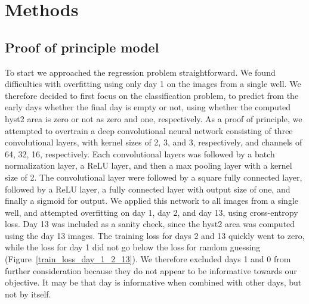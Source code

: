 \documentclass[10pt,twocolumn,letterpaper]{article}
\begin{document}



 \section{Methods}
 
 \subsection{Proof of principle model}
 \label{proof_of_principle}
 
 To start we approached the regression problem straightforward.  We found difficulties with overfitting using only day 1 on the images from a single well.  We therefore decided to first focus on the classification problem, to predict from the early days whether the final day is empty or not, using whether the computed hyst2 area is zero or not as zero and one, respectively.   As a proof of principle, we attempted to overtrain a deep convolutional neural network consisting of three convolutional layers, with kernel sizes of 2, 3, and 3, respectively, and channels of 64, 32, 16, respectively.  Each convolutional layers was followed by a batch normalization layer, a ReLU layer, and then a max pooling layer with a kernel size of 2.  The convolutional layer were followed by a square fully connected layer, followed by a ReLU layer, a fully connected layer with output size of one, and finally a sigmoid for output.  We applied this network to all images from a single well, and attempted overfitting on day 1, day 2, and day 13, using cross-entropy loss.  Day 13 was included as a sanity check, since the hyst2 area was computed using the day 13 images.  The training loss for days 2 and 13 quickly went to zero, while the loss for day 1 did not go below the loss for random guessing (Figure~\ref{train_loss_day_1_2_13}).  We therefore excluded days 1 and 0 from further consideration because they do not appear to be informative towards our objective.  It may be that day is informative when combined with other days, but not by itself.
 
\end{document}
